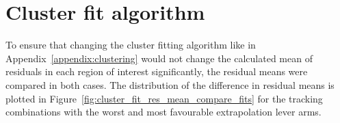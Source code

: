\section{Cluster fit algorithm}
\label{appendix:systematics_cluster_fit_fcn}
To ensure that changing the cluster fitting algorithm like in Appendix~\ref{appendix:clustering} would not change the calculated mean of residuals in each region of interest significantly, the residual means were compared in both cases. The distribution of the difference in residual means is plotted in Figure~\ref{fig:cluster_fit_res_mean_compare_fits} for the tracking combinations with the worst and most favourable extrapolation lever arms.

